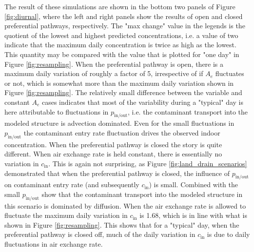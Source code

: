 \documentclass[journal=esthag,manuscript=article]{achemso}
\begin{document}
The result of these simulations are shown in the bottom two panels of Figure \ref{fig:diurnal}, where the left and right panels show the results of open and closed preferential pathways, respectively.
The "max change" value in the legends is the quotient of the lowest and highest predicted concentrations, i.e. a value of two indicate that the maximum daily concentration is twice as high as the lowest.
This quantity may be compared with the value that is plotted for "one day" in Figure \ref{fig:resampling}.
When the preferential pathway is open, there is a maximum daily variation of roughly a factor of 5, irrespective of if $A_e$ fluctuates or not, which is somewhat more than the maximum daily variation shown in Figure \ref{fig:resampling}.
The relatively small difference between the variable and constant $A_e$ cases indicates that most of the variability during a "typical" day is here attributable to fluctuations in $p_\mathrm{in/out}$, i.e. the contaminant transport into the modeled structure is advection dominated.
Even for the small fluctuations in $p_\mathrm{in/out}$ the contaminant entry rate fluctuation drives the observed indoor concentration.
When the preferential pathway is closed the story is quite different.
When air exchange rate is held constant, there is essentially no variation in $c_\mathrm{in}$.
This is again not surprising, as Figure \ref{fig:land_drain_scenarios} demonstrated that when the preferential pathway is closed, the influence of $p_\mathrm{in/out}$ on contaminant entry rate (and subsequently $c_\mathrm{in}$) is small.
Combined with the small $p_\mathrm{in/out}$ show that the contaminant transport into the modeled structure in this scenario is dominated by diffusion.
When the air exchange rate is allowed to fluctuate the maximum daily variation in $c_\mathrm{in}$ is 1.68, which is in line with what is shown in Figure \ref{fig:resampling}.
This shows that for a "typical" day, when the preferential pathway is closed off, much of the daily variation in $c_\mathrm{in}$ is due to daily fluctuations in air exchange rate.\par
\end{document}
